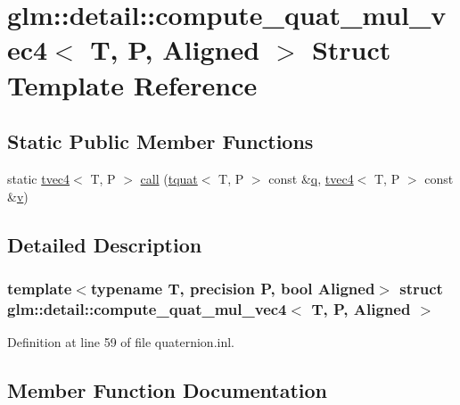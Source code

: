 \hypertarget{structglm_1_1detail_1_1compute__quat__mul__vec4}{}\section{glm\+::detail\+::compute\+\_\+quat\+\_\+mul\+\_\+vec4$<$ T, P, Aligned $>$ Struct Template Reference}
\label{structglm_1_1detail_1_1compute__quat__mul__vec4}
\subsection*{Static Public Member Functions}
\begin{DoxyCompactItemize}
\item 
static \mbox{\hyperlink{structglm_1_1tvec4}{tvec4}}$<$ T, P $>$ \mbox{\hyperlink{structglm_1_1detail_1_1compute__quat__mul__vec4_a38e75c5b7f8f3e588ba90a46b432ac0c}{call}} (\mbox{\hyperlink{structglm_1_1tquat}{tquat}}$<$ T, P $>$ const \&\mbox{\hyperlink{glad_8h_a514729309336df22bcc8eda979d6ced4}{q}}, \mbox{\hyperlink{structglm_1_1tvec4}{tvec4}}$<$ T, P $>$ const \&\mbox{\hyperlink{glad_8h_a14cfbe2fc2234f5504618905b69d1e06}{v}})
\end{DoxyCompactItemize}


\subsection{Detailed Description}
\subsubsection*{template$<$typename T, precision P, bool Aligned$>$\newline
struct glm\+::detail\+::compute\+\_\+quat\+\_\+mul\+\_\+vec4$<$ T, P, Aligned $>$}



Definition at line 59 of file quaternion.\+inl.



\subsection{Member Function Documentation}
\mbox{\label{structglm_1_1detail_1_1compute__quat__mul__vec4_a38e75c5b7f8f3e588ba90a46b432ac0c}} 
